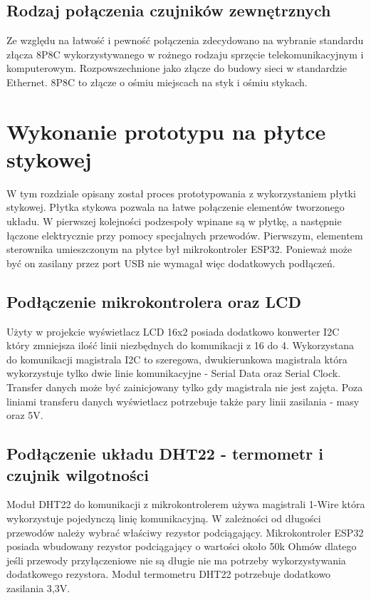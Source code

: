 \documentclass[11pt]{report}
\begin{document}
 \section{Rodzaj połączenia czujników zewnętrznych}
 Ze względu na łatwość i pewność połączenia zdecydowano na wybranie standardu złącza 8P8C wykorzystywanego w rożnego rodzaju sprzęcie telekomunikacyjnym i komputerowym. Rozpowszechnione jako złącze do budowy sieci w standardzie Ethernet. 8P8C to złącze o ośmiu miejscach na styk i ośmiu stykach.
 
 
 \chapter{Wykonanie prototypu na płytce stykowej}
 W tym rozdziale opisany został proces prototypowania z wykorzystaniem płytki stykowej.
 Płytka stykowa pozwala na łatwe połączenie elementów tworzonego układu. W pierwszej kolejności podzespoły wpinane są w płytkę, a następnie łączone elektrycznie przy pomocy specjalnych przewodów.
 Pierwszym, elementem sterownika umieszczonym na płytce był mikrokontroler ESP32. Ponieważ może być on zasilany przez port USB nie wymagał więc dodatkowych podłączeń. 
 
 \section{Podłączenie mikrokontrolera oraz LCD}
 Użyty w projekcie wyświetlacz LCD 16x2 posiada dodatkowo konwerter I2C który zmniejsza ilość linii niezbędnych do komunikacji z 16 do 4. Wykorzystana do komunikacji magistrala I2C to szeregowa, dwukierunkowa magistrala która wykorzystuje tylko dwie linie komunikacyjne - Serial Data oraz Serial Clock. Transfer danych może być zainicjowany tylko gdy magistrala nie jest zajęta. Poza liniami transferu danych wyświetlacz potrzebuje także pary linii zasilania - masy oraz 5V.
  
 \section{Podłączenie układu DHT22 - termometr i czujnik wilgotności}\label{dht}
 Moduł DHT22 do komunikacji z mikrokontrolerem używa magistrali 1-Wire która wykorzystuje pojedynczą linię komunikacyjną. W zależności od długości przewodów należy wybrać właściwy rezystor podciągający. Mikrokontroler ESP32 posiada wbudowany rezystor podciągający o wartości około 50k Ohmów dlatego jeśli przewody przyłączeniowe nie są długie nie ma potrzeby wykorzystywania dodatkowego rezystora.
 Moduł termometru DHT22 potrzebuje dodatkowo zasilania 3,3V.
 
\end{document}
